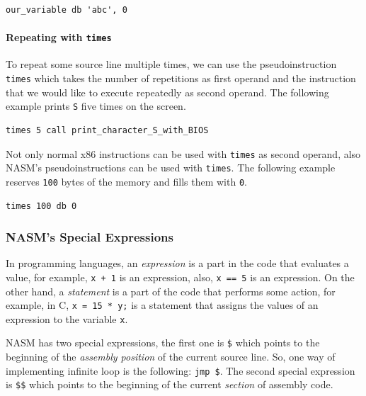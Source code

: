 \begin{lstlisting}
our_variable db 'abc', 0
\end{lstlisting}

\paragraph{\texorpdfstring{Repeating with
\texttt{times}}{Repeating with times}}\label{repeating-with-times}

To repeat some source line multiple times, we can use the
pseudoinstruction \lstinline!times! which takes the number of
repetitions as first operand and the instruction that we would like to
execute repeatedly as second operand. The following example prints
\lstinline!S! five times on the screen.

\begin{lstlisting}
times 5 call print_character_S_with_BIOS
\end{lstlisting}

Not only normal x86 instructions can be used with \lstinline!times! as
second operand, also NASM's pseudoinstructions can be used with
\lstinline!times!. The following example reserves \lstinline!100! bytes
of the memory and fills them with \lstinline!0!.

\begin{lstlisting}
times 100 db 0
\end{lstlisting}

\subsubsection{NASM's Special
Expressions}\label{nasms-special-expressions}

In programming languages, an \emph{expression} is a part in the code
that evaluates a value, for example, \lstinline!x + 1! is an expression,
also, \lstinline!x == 5! is an expression. On the other hand, a
\emph{statement} is a part of the code that performs some action, for
example, in C, \lstinline!x = 15 * y;! is a statement that assigns the
values of an expression to the variable \lstinline!x!.

NASM has two special expressions, the first one is \lstinline!$! which
points to the beginning of the \emph{assembly position} of the current
source line. So, one way of implementing infinite loop is the following:
\lstinline!jmp $!. The second special expression is \lstinline!$$! which
points to the beginning of the current \emph{section} of assembly code.

